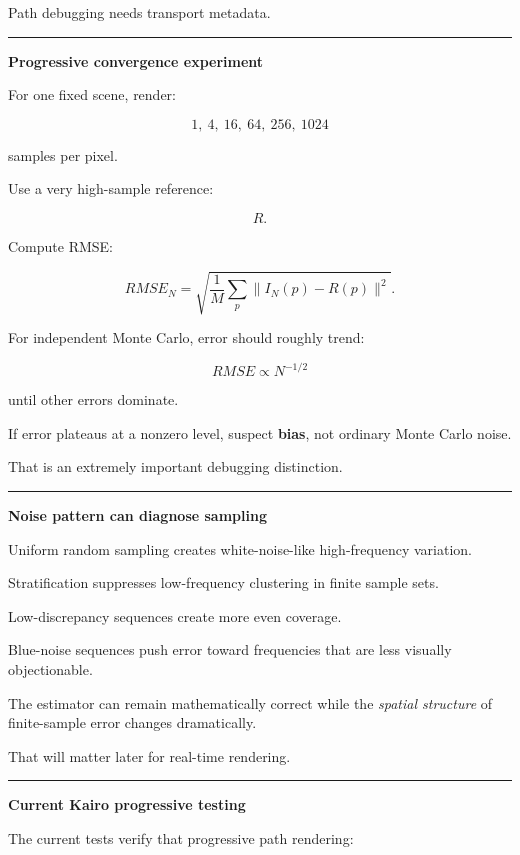 Path debugging needs transport metadata.

\begin{center}\rule{0.5\linewidth}{0.5pt}\end{center}

\textbf{Progressive convergence experiment}

For one fixed scene, render:

\[
1,\ 4,\ 16,\ 64,\ 256,\ 1024
\]

samples per pixel.

Use a very high-sample reference:

\[
R.
\]

Compute RMSE:

\[
RMSE_N
=
\sqrt{
\frac1M
\sum_p
\|I_N(p)-R(p)\|^2
}.
\]

For independent Monte Carlo, error should roughly trend:

\[
\boxed{
RMSE\propto N^{-1/2}
}
\]

until other errors dominate.

If error plateaus at a nonzero level, suspect \textbf{bias}, not ordinary Monte Carlo noise.

That is an extremely important debugging distinction.

\begin{center}\rule{0.5\linewidth}{0.5pt}\end{center}

\textbf{Noise pattern can diagnose sampling}

Uniform random sampling creates white-noise-like high-frequency variation.

Stratification suppresses low-frequency clustering in finite sample sets.

Low-discrepancy sequences create more even coverage.

Blue-noise sequences push error toward frequencies that are less visually objectionable.

The estimator can remain mathematically correct while the \emph{spatial structure} of finite-sample error changes dramatically.

That will matter later for real-time rendering.

\begin{center}\rule{0.5\linewidth}{0.5pt}\end{center}

\textbf{Current Kairo progressive testing}

The current tests verify that progressive path rendering:

